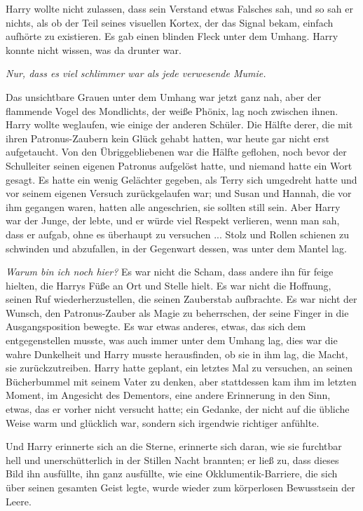 Harry wollte nicht zulassen, dass sein Verstand etwas Falsches sah, und so sah
er nichts, als ob der Teil seines visuellen Kortex, der das Signal bekam,
einfach aufhörte zu existieren. Es gab einen blinden Fleck unter dem Umhang.
Harry konnte nicht wissen, was da drunter war.

\emph{Nur, dass es viel schlimmer war als jede verwesende Mumie.}

Das unsichtbare Grauen unter dem Umhang war jetzt ganz nah, aber der flammende
Vogel des Mondlichts, der weiße Phönix, lag noch zwischen ihnen. Harry wollte
weglaufen, wie einige der anderen Schüler. Die Hälfte derer, die mit ihren
Patronus-Zaubern kein Glück gehabt hatten, war heute gar nicht erst aufgetaucht.
Von den Übriggebliebenen war die Hälfte geflohen, noch bevor der Schulleiter
seinen eigenen Patronus aufgelöst hatte, und niemand hatte ein Wort gesagt. Es
hatte ein wenig Gelächter gegeben, als Terry sich umgedreht hatte und vor seinem
eigenen Versuch zurückgelaufen war; und Susan und Hannah, die vor ihm gegangen
waren, hatten alle angeschrien, sie sollten still sein. Aber Harry war der
Junge, der lebte, und er würde viel Respekt verlieren, wenn man sah, dass er
aufgab, ohne es überhaupt zu versuchen ... Stolz und Rollen schienen zu schwinden
und abzufallen, in der Gegenwart dessen, was unter dem Mantel lag.

\emph{Warum bin ich noch hier?} Es war nicht die Scham, dass andere ihn für
feige hielten, die Harrys Füße an Ort und Stelle hielt. Es war nicht die
Hoffnung, seinen Ruf wiederherzustellen, die seinen Zauberstab aufbrachte. Es
war nicht der Wunsch, den Patronus-Zauber als Magie zu beherrschen, der seine
Finger in die Ausgangsposition bewegte. Es war etwas anderes, etwas, das sich
dem entgegenstellen musste, was auch immer unter dem Umhang lag, dies war die
wahre Dunkelheit und Harry musste herausfinden, ob sie in ihm lag, die Macht,
sie zurückzutreiben. Harry hatte geplant, ein letztes Mal zu versuchen, an
seinen Bücherbummel mit seinem Vater zu denken, aber stattdessen kam ihm im
letzten Moment, im Angesicht des Dementors, eine andere Erinnerung in den Sinn,
etwas, das er vorher nicht versucht hatte; ein Gedanke, der nicht auf die
übliche Weise warm und glücklich war, sondern sich irgendwie richtiger anfühlte.

Und Harry erinnerte sich an die Sterne, erinnerte sich daran, wie sie furchtbar
hell und unerschütterlich in der Stillen Nacht brannten; er ließ zu, dass dieses
Bild ihn ausfüllte, ihn ganz ausfüllte, wie eine Okklumentik-Barriere, die sich
über seinen gesamten Geist legte, wurde wieder zum körperlosen Bewusstsein der
Leere.

